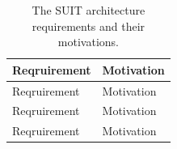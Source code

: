 \documentclass[0-thesis.tex]{subfiles}
\begin{document}
\begin{longtable}[]{@{}ll@{}}
    \caption{The SUIT architecture requirements and their motivations.}
    \label{tab:architecture-evaluation}\\
    \toprule
    \begin{minipage}[b]{0.41\columnwidth}\raggedright\strut
    Reqruirement\strut
    \end{minipage} & \begin{minipage}[b]{0.53\columnwidth}\raggedright\strut
    Motivation\strut
    \end{minipage}\tabularnewline
    \midrule
    \endfirsthead
    \toprule
    \begin{minipage}[b]{0.41\columnwidth}\raggedright\strut
    Reqruirement\strut
    \end{minipage} & \begin{minipage}[b]{0.53\columnwidth}\raggedright\strut
    Motivation\strut
    \end{minipage}\tabularnewline
    \midrule
    \endhead
    \toprule
    \begin{minipage}[b]{0.41\columnwidth}\raggedright\strut
    Reqruirement\strut
    \end{minipage} & \begin{minipage}[b]{0.53\columnwidth}\raggedright\strut
    Motivation\strut
    \end{minipage}\tabularnewline
    \midrule
    \endhead
    \toprule
    \begin{minipage}[b]{0.41\columnwidth}\raggedright\strut
    Reqruirement\strut
    \end{minipage} & \begin{minipage}[b]{0.53\columnwidth}\raggedright\strut
    Motivation\strut
    \end{minipage}\tabularnewline
    \midrule
    \endhead


\end{longtable}
\end{document}
